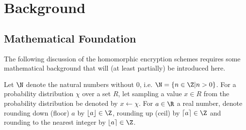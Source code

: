 \chapter{Background}
\label{chap:background}

\section{Mathematical Foundation}
The following discussion of the homomorphic encryption schemes requires some mathematical background that
will (at least partially) be introduced here.

Let $\N$ denote the natural numbers without $0$, i.e. $\N = \{n \in \Z | n > 0\}$.
For a probability distribution $\chi$ over a set $R$, let sampling a value $x \in R$ from the probability distribution be denoted by $x \leftarrow \chi$.
For $a \in \R$ a real number, denote rounding down (floor) $a$ by $\lfloor a \rfloor \in \Z$,
rounding up (ceil) by $\lceil a \rceil \in \Z$ and rounding to the nearest integer by
$\lfloor a \rceil \in \Z$.

